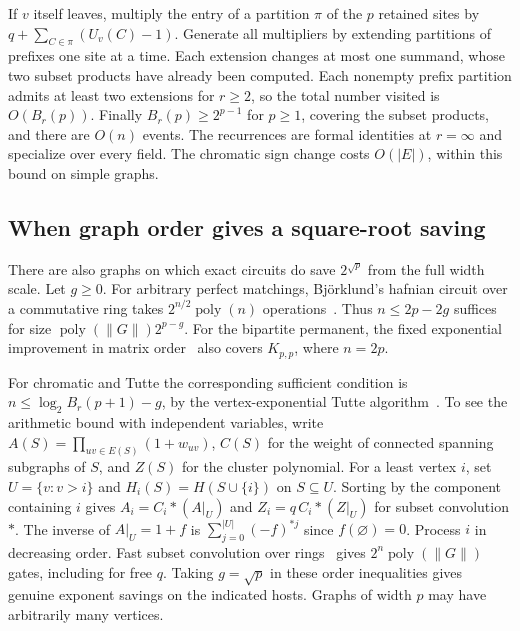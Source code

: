 \documentclass[11pt]{article}
\theoremstyle{definition}
\begin{document}
If \(v\) itself leaves, multiply the entry of a partition \(\pi\) of the \(p\) retained sites by \(q+\sum_{C\in\pi}(U_v(C)-1)\). Generate all multipliers by extending partitions of prefixes one site at a time. Each extension changes at most one summand, whose two subset products have already been computed. Each nonempty prefix partition admits at least two extensions for \(r\ge2\), so the total number visited is \(O(B_r(p))\). Finally \(B_r(p)\ge2^{p-1}\) for \(p\ge1\), covering the subset products, and there are \(O(n)\) events. The recurrences are formal identities at \(r=\infty\) and specialize over every field. The chromatic sign change costs \(O(|E|)\), within this bound on simple graphs.

\subsection{When graph order gives a square-root saving}

There are also graphs on which exact circuits do save \(2^{\sqrt p}\) from the full width scale. Let \(g\ge0\). For arbitrary perfect matchings, Björklund's hafnian circuit over a commutative ring takes \(2^{n/2}\operatorname{poly}(n)\) operations~\cite{hafnian-ryser}. Thus \(n\le2p-2g\) suffices for size \(\operatorname{poly}(\|G\|)2^{p-g}\). For the bipartite permanent, the fixed exponential improvement in matrix order~\cite{stars} also covers \(K_{p,p}\), where \(n=2p\).

For chromatic and Tutte the corresponding sufficient condition is \(n\le\log_2 B_r(p+1)-g\), by the vertex-exponential Tutte algorithm~\cite{vertex-tutte}. To see the arithmetic bound with independent variables, write \(A(S)=\prod_{uv\in E(S)}(1+w_{uv})\), \(C(S)\) for the weight of connected spanning subgraphs of \(S\), and \(Z(S)\) for the cluster polynomial. For a least vertex \(i\), set \(U=\{v:v>i\}\) and \(H_i(S)=H(S\cup\{i\})\) on \(S\subseteq U\). Sorting by the component containing \(i\) gives \(A_i=C_i*(A|_U)\) and \(Z_i=q\,C_i*(Z|_U)\) for subset convolution \(*\). The inverse of \(A|_U=1+f\) is \(\sum_{j=0}^{|U|}(-f)^{*j}\) since \(f(\varnothing)=0\). Process \(i\) in decreasing order. Fast subset convolution over rings~\cite{fast-subset-convolution} gives \(2^n\operatorname{poly}(\|G\|)\) gates, including for free \(q\). Taking \(g=\sqrt p\) in these order inequalities gives genuine exponent savings on the indicated hosts. Graphs of width \(p\) may have arbitrarily many vertices.

\appendix
\end{document}
